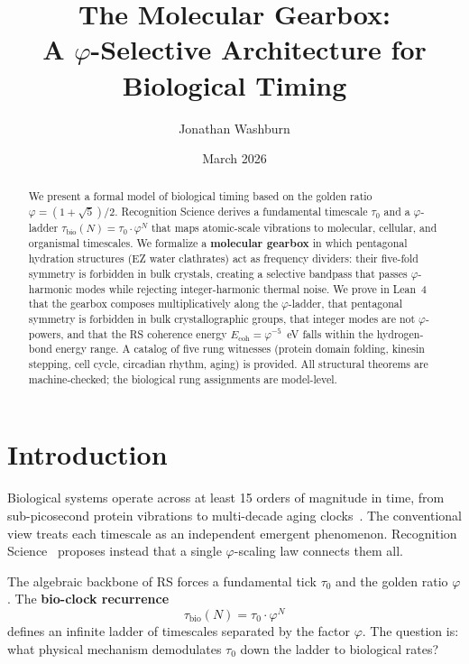 \documentclass[11pt,twocolumn]{article}
\title{The Molecular Gearbox:\\A $\varphi$-Selective Architecture for Biological Timing}
\author[1]{Jonathan Washburn}
\affil[1]{Independent Researcher}
\date{March 2026}
\begin{document}
\maketitle

\begin{abstract}
We present a formal model of biological timing based on the golden ratio
$\varphi = (1+\sqrt{5})/2$. Recognition Science derives a fundamental
timescale $\tau_0$ and a $\varphi$-ladder
$\tau_{\mathrm{bio}}(N) = \tau_0 \cdot \varphi^N$ that maps atomic-scale
vibrations to molecular, cellular, and organismal timescales. We formalize
a \textbf{molecular gearbox} in which pentagonal hydration structures
(EZ water clathrates) act as frequency dividers: their five-fold symmetry
is forbidden in bulk crystals, creating a selective bandpass that passes
$\varphi$-harmonic modes while rejecting integer-harmonic thermal noise.
We prove in Lean~4 that the gearbox composes multiplicatively along the
$\varphi$-ladder, that pentagonal symmetry is forbidden in bulk
crystallographic groups, that integer modes are not $\varphi$-powers, and
that the RS coherence energy $E_{\mathrm{coh}} = \varphi^{-5}$~eV falls
within the hydrogen-bond energy range. A catalog of five rung witnesses
(protein domain folding, kinesin stepping, cell cycle, circadian rhythm,
aging) is provided. All structural theorems are machine-checked; the
biological rung assignments are model-level.
\end{abstract}

\section{Introduction}

Biological systems operate across at least 15 orders of magnitude in
time, from sub-picosecond protein vibrations to multi-decade aging
clocks~\cite{Frauenfelder2009}. The conventional view treats each
timescale as an independent emergent phenomenon. Recognition
Science~\cite{Washburn2025} proposes instead that a single
$\varphi$-scaling law connects them all.

The algebraic backbone of RS forces a fundamental tick $\tau_0$ and the
golden ratio $\varphi$. The \textbf{bio-clock recurrence}
\begin{equation}\label{eq:bioclock}
  \tau_{\mathrm{bio}}(N) = \tau_0 \cdot \varphi^N
\end{equation}
defines an infinite ladder of timescales separated by the factor
$\varphi$. The question is: what physical mechanism demodulates
$\tau_0$ down the ladder to biological rates?
\end{document}
